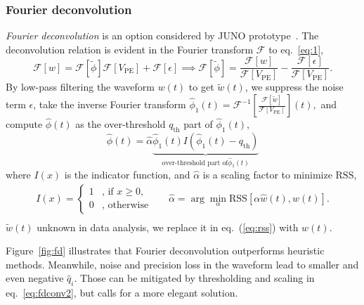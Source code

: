 \subsubsection{Fourier deconvolution}
\textit{Fourier deconvolution} is an option considered by JUNO prototype~\cite{zhang_comparison_2019}. The deconvolution relation is evident in the Fourier transform $\mathcal{F}$ to eq.~\eqref{eq:1},
\begin{equation}
  \label{eq:fourier}
  \mathcal{F}[w]  = \mathcal{F}[\tilde{\phi}]\mathcal{F}[V_\mathrm{PE}] + \mathcal{F}[\epsilon]
  \implies \mathcal{F}[\tilde{\phi}]  = \frac{\mathcal{F}[w]}{\mathcal{F}[V_\mathrm{PE}]} - \frac{\mathcal{F}[\epsilon]}{\mathcal{F}[V_\mathrm{PE}]}.
\end{equation}
By low-pass filtering the waveform $w(t)$ to get $\tilde{w}(t)$, we suppress the noise term $\epsilon$, take the inverse Fourier transform $\hat{\phi}_1(t) = \mathcal{F}^{-1}\left[\frac{\mathcal{F}[\tilde{w}]}{\mathcal{F}[V_\mathrm{PE}]}\right](t),$ and compute $\hat{\phi}(t)$ as the over-threshold $q_\mathrm{th}$ part of $\hat{\phi}_1(t)$,
\begin{equation}
  \label{eq:fdconv2}
    \hat{\phi}(t) = \hat{\alpha}\underbrace{\hat{\phi}_1(t) I\left(\hat{\phi}_1(t) - q_\mathrm{th}\right)}_{\text{over-threshold part of} \hat{\phi}_1(t)}  
\end{equation}
where $I(x)$ is the indicator function, and $\hat{\alpha}$ is a scaling factor to minimize $\mathrm{RSS}$,
\begin{equation*}
  \begin{aligned}
  \label{eq:id}
  I(x) = \left\{
    \begin{array}{ll}
      1 & \mbox{, if $x\ge0$}, \\
      0 & \mbox{, otherwise}
    \end{array}
    \right.
    \quad~~~
    \hat{\alpha} = \arg \underset{\alpha}{\min}\mathrm{RSS}\left[\alpha\hat{w}(t),w(t)\right]. \\
  \end{aligned}
\end{equation*}
$\tilde{w}(t)$ unknown in data analysis, we replace it in eq.~(\ref{eq:rss}) with $w(t)$.

Figure~\ref{fig:fd} illustrates that Fourier deconvolution outperforms heuristic methods.  Meanwhile, noise and precision loss in the waveform lead to smaller and even negative $\hat{q}_i$. Those can be mitigated by thresholding and scaling in eq.~\eqref{eq:fdconv2}, but calls for a more elegant solution.

